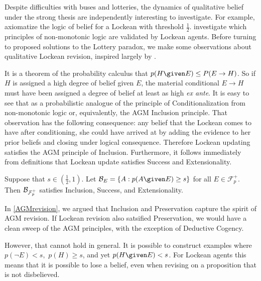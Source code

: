 Despite difficulties with buses and lotteries, the dynamics of qualitative
belief under the strong thesis are independently interesting to investigate. For
example, \citet{vaneijck2014bet} axiomatize the logic of belief for a Lockean
with threshold $\frac{1}{2}$. \citet{makinson2015lossy} investigate which
principles of non-monotonic logic are validated by Lockean agents. Before
turning to proposed solutions to the Lottery paradox, we make some observations
about qualitative Lockean revision,  inspired largely by \citet{shear2018two}.

It is a theorem of the probability calculus that $p(H \given E) \leq
P(E\rightarrow H)$. So if $H$ is assigned a high degree of belief given $E$, the
material conditional $E\rightarrow H$ must have been assigned a degree of belief
at least as high {\em ex ante}. It is easy to see that as a probabilistic
analogue of the principle of Conditionalization from non-monotonic logic or,
equivalently, the AGM Inclusion principle. That observation has the following
consequence: any belief that the Lockean comes to have after conditioning, she
could have arrived at by adding the evidence to her prior beliefs and closing
under logical consequence. Therefore Lockean updating satisfies the AGM
principle of Inclusion. Furthermore, it follows immediately from definitions
that Lockean update satisfies Success and Extensionality.
\begin{theorem}
Suppose that $s\in (\frac{1}{2}, 1)$. Let $\cb_E = \{ A : p(A \given E) \geq
s\}$ for all $E\in\mathcal{F}_p^+$. Then $\mathcal{B}_{\mathcal{F}_p^+}$ satisfies
Inclusion, Success, and Extensionality.  
\end{theorem}
In \autoref{AGMrevision}, we argued that Inclusion and Preservation capture the
spirit of AGM revision. If Lockean revision also satsified Preservation, we
would have a clean sweep of the AGM principles, with the exception of Deductive
Cogency.

However, that cannot hold in general. It is possible to construct examples where
$p(\neg E) < s,$ $p(H)\geq s$, and yet $p(H \given E)<s$. For Lockean agents
this means that it is possible to lose a belief, even when revising on a
proposition that is not disbelieved.

